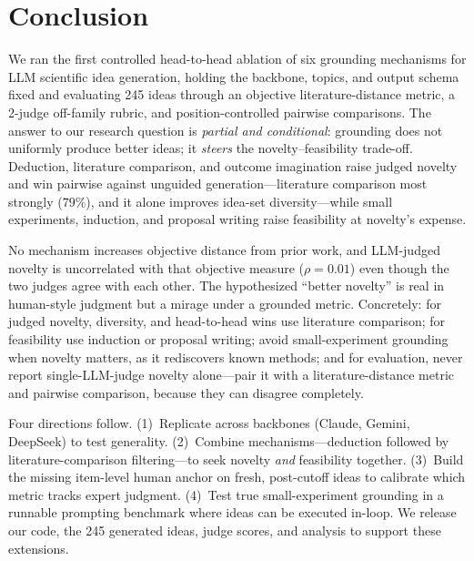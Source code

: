 \section{Conclusion}
\label{sec:conclusion}

We ran the first controlled head-to-head ablation of six grounding mechanisms for LLM scientific idea generation, holding the backbone, topics, and output schema fixed and evaluating 245 ideas through an objective literature-distance metric, a 2-judge off-family rubric, and position-controlled pairwise comparisons. The answer to our research question is \emph{partial and conditional}: grounding does not uniformly produce better ideas; it \emph{steers} the novelty--feasibility trade-off. Deduction, literature comparison, and outcome imagination raise judged novelty and win pairwise against unguided generation---literature comparison most strongly ($79\%$), and it alone improves idea-set diversity---while small experiments, induction, and proposal writing raise feasibility at novelty's expense.

 No mechanism increases objective distance from prior work, and LLM-judged novelty is uncorrelated with that objective measure ($\rho = 0.01$) even though the two judges agree with each other. The hypothesized ``better novelty'' is real in human-style judgment but a mirage under a grounded metric. Concretely: for judged novelty, diversity, and head-to-head wins use literature comparison; for feasibility use induction or proposal writing; avoid small-experiment grounding when novelty matters, as it rediscovers known methods; and for evaluation, never report single-LLM-judge novelty alone---pair it with a literature-distance metric and pairwise comparison, because they can disagree completely.

 Four directions follow. (1)~Replicate across backbones (Claude, Gemini, DeepSeek) to test generality. (2)~Combine mechanisms---\eg deduction followed by literature-comparison filtering---to seek novelty \emph{and} feasibility together. (3)~Build the missing item-level human anchor on fresh, post-cutoff ideas to calibrate which metric tracks expert judgment. (4)~Test true small-experiment grounding in a runnable prompting benchmark where ideas can be executed in-loop. We release our code, the 245 generated ideas, judge scores, and analysis to support these extensions.
